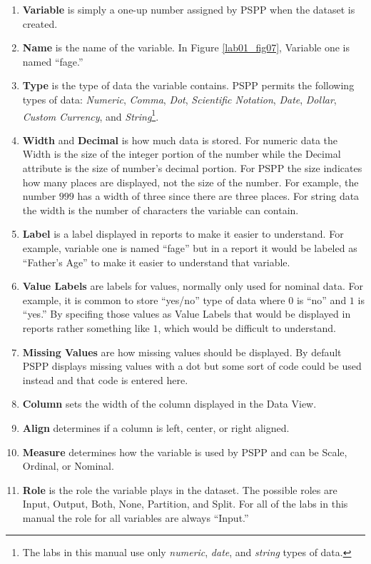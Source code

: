 \begin{enumerate}
  \item \textbf{Variable} is simply a one-up number assigned by \acs{PSPP} when the dataset is created. 
  \item \textbf{Name} is the name of the variable. In Figure \ref{lab01_fig07}, Variable one is named ``fage.''
  \item \textbf{Type} is the type of data the variable contains. \acs{PSPP} permits the following types of data: \textit{Numeric}, \textit{Comma}, \textit{Dot}, \textit{Scientific Notation}, \textit{Date}, \textit{Dollar}, \textit{Custom Currency}, and \textit{String}\footnote{The labs in this manual use only \textit{numeric}, \textit{date}, and \textit{string} types of data.}.
  \item \textbf{Width} and \textbf{Decimal} is how much data is stored. For numeric data the Width is the size of the integer portion of the number while the Decimal attribute is the size of number's decimal portion. For \acs{PSPP} the size indicates how many places are displayed, not the size of the number. For example, the number $ 999 $ has a width of three since there are three places. For string data the width is the number of characters the variable can contain.
  \item \textbf{Label} is a label displayed in reports to make it easier to understand. For example, variable one is named ``fage'' but in a report it would be labeled as ``Father's Age'' to make it easier to understand that variable.
  \item \textbf{Value Labels} are labels for values, normally only used for nominal data. For example, it is common to store ``yes/no'' type of data where $ 0 $ is ``no'' and $ 1 $ is ``yes.'' By specifing those values as Value Labels that would be displayed in reports rather something like $ 1 $, which would be difficult to understand.
  \item \textbf{Missing Values} are how missing values should be displayed. By default \acs{PSPP} displays missing values with a dot but some sort of code could be used instead and that code is entered here.
  \item \textbf{Column} sets the width of the column displayed in the Data View.
  \item \textbf{Align} determines if a column is left, center, or right aligned.
  \item \textbf{Measure} determines how the variable is used by \acs{PSPP} and can be Scale, Ordinal, or Nominal.
  \item \textbf{Role} is the role the variable plays in the dataset. The possible roles are Input, Output, Both, None, Partition, and Split. For all of the labs in this manual the role for all variables are always ``Input.''
\end{enumerate}


